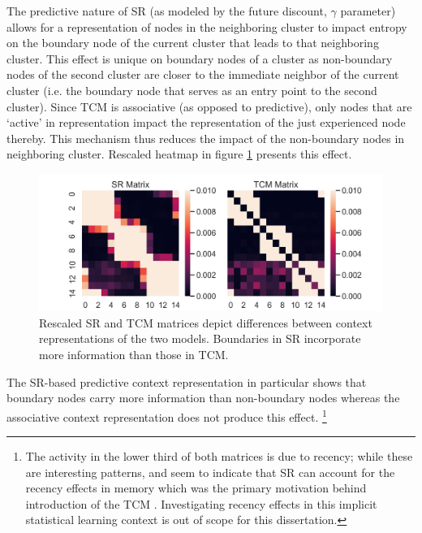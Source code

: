 The predictive nature of SR (as modeled by the future discount, $\gamma$ parameter) allows for a representation of nodes in the neighboring cluster to impact entropy on the boundary node of the current cluster that leads to that neighboring cluster. This effect is unique on boundary nodes of a cluster as non-boundary nodes of the second cluster are closer to the immediate neighbor of the current cluster (i.e. the boundary node that serves as an entry point to the second cluster). Since TCM is associative (as opposed to predictive), only nodes that are `active' in representation impact the representation of the just experienced node thereby. This mechanism thus reduces the impact of the non-boundary nodes in neighboring cluster. Rescaled heatmap in figure \ref{fig:zoomed-in-SRTCM-boundary-entropy} presents this effect.

\begin{figure}[ht]
	\centering
	\includegraphics[width = \textwidth]{chapter_notebooks/chapter_2/figures/SR_vs_TCM_Matrices_zoomed.png}
	\caption{Rescaled SR and TCM matrices depict differences between context representations of the two models. Boundaries in SR incorporate more information than those in TCM.}
	\label{fig:zoomed-in-SRTCM-boundary-entropy}
\end{figure}

The SR-based predictive context representation in particular shows that boundary nodes carry more information than non-boundary nodes whereas the associative context representation does not produce this effect. \footnote{The activity in the lower third of both matrices is due to recency; while these are interesting patterns, and seem to indicate that SR can account for the recency effects in memory which was the primary motivation behind introduction of the TCM \parencite{gershman2012successor,howard2005temporal}. Investigating recency effects in this implicit statistical learning context is out of scope for this dissertation.}

